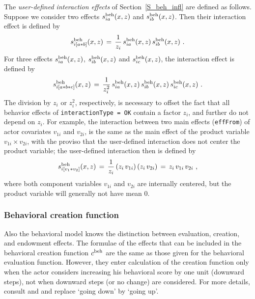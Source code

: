 \documentclass[a4paper,fleqn,11pt]{article}
\newcommand{\+}{\, + \,}
\begin{document}
The \emph{user-defined interaction effects} of Section~\ref{S_beh_infl}
are defined as follows.
Suppose we consider two effects $s^{\rm beh}_{ia}(x, z)$ and
$s^{\rm beh}_{ib}(x, z)$. Then their interaction effect is defined by
\begin{equation}
    s^{\rm beh}_{i [a\ast b] }(x, z) \,=\,
      \frac{1}{z_i} \, s^{\rm beh}_{ia}(x, z) \, s^{\rm beh}_{ib}(x, z) \ .
\end{equation}
For three effects $s^{\rm beh}_{ia}(x, z)$,
$s^{\rm beh}_{ib}(x, z)$ and $s^{\rm beh}_{ic}(x, z)$,
the interaction effect is defined by
\begin{equation}
    s^{\rm beh}_{i [a\ast b \ast c] }(x, z) \,=\,
      \frac{1}{z_i^2} \, s^{\rm beh}_{ia}(x, z) \,
                      s^{\rm beh}_{ib}(x, z) \, s^{\rm beh}_{ic}(x, z)\ .
\end{equation}
The division by $z_i$ or $z_i^2$, respectively, is necessary to offset the
fact that all behavior effects of \texttt{interactionType = OK} contain
a factor $z_i$, and further do not depend on $z_i$.
For example, the interaction between two main effects (\texttt{effFrom})
of actor covariates $v_{1i}$ and $v_{2i}$, is the same as
the main effect of the product variable $v_{1i}\times v_{2i}$,
with the proviso that the user-defined interaction does not center
the product variable;  the user-defined interaction
then is defined by
\begin{equation}
    s^{\rm beh}_{i [v_1\ast v_2] }(x, z) \,=\,
              \frac{1}{z_i}\, ( z_i \, v_{1i})  \, ( z_i \, v_{2i}) \,=\,
                      z_i \, v_{1i}\,v_{2i}  \ ,
\end{equation}
where both component variables $v_{1i}$ and $v_{2i}$
are internally centered, but the product variable will generally not have
mean 0.


\subsubsection{Behavioral creation function}
Also the behavioral model knows the distinction between evaluation,
creation, and
endowment effects. The formulae of the effects that can be included
in the behavioral creation function $c^{\rm beh}$ are the same as
those given for the behavioral evaluation function. However, they enter
calculation of the creation function only when the actor considers
increasing his behavioral score by one unit (downward steps), not
when downward steps (or no change) are considered. For more details,
consult
\citet*{SnijdersEA07} and \citet*{SteglichEA10}
and replace `going down' by `going up'.
\end{document}
